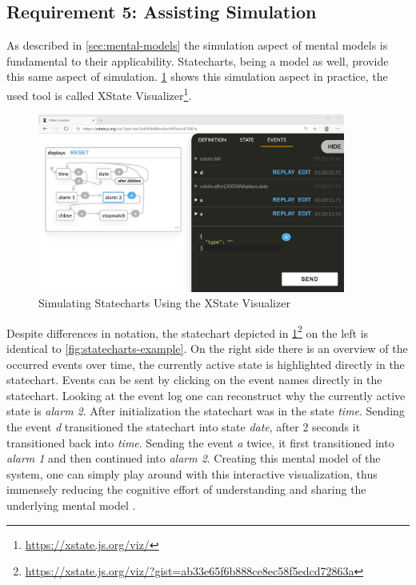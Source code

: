 \subsection{Requirement 5: Assisting Simulation}
As described in \cref{sec:mental-models} the simulation aspect of mental models is fundamental to their applicability.
Statecharts, being a model as well, provide this same aspect of simulation.
\cref{fig:xstate-simulation} shows this simulation aspect in practice, the used tool is called XState Visualizer\footnote{\url{https://xstate.js.org/viz/}}.
\begin{figure}[h]
\centering
\includegraphics[width=0.9\textwidth]{images/xstate-simulation}
\caption{Simulating Statecharts Using the XState Visualizer}
\label{fig:xstate-simulation}
\end{figure}
Despite differences in notation, the statechart depicted in \cref{fig:xstate-simulation}\footnote{\url{https://xstate.js.org/viz/?gist=ab33e65f6b888ce8ec58f5edcd72863a}} on the left is identical to \cref{fig:statecharts-example}.
On the right side there is an overview of the occurred events over time, the currently active state is highlighted directly in the statechart.
Events can be sent by clicking on the event names directly in the statechart.
Looking at the event log one can reconstruct why the currently active state is \emph{alarm 2}.
After initialization the statechart was in the state \emph{time}. Sending the event \emph{d} transitioned the statechart into state \emph{date}, after 2 seconds it transitioned back into \emph{time}.
Sending the event \emph{a} twice, it first transitioned into \emph{alarm 1} and then continued into \emph{alarm 2}.
Creating this mental model of the system, one can simply play around with this interactive visualization, thus immensely reducing the cognitive effort of understanding and sharing the underlying mental model \autocite{dutke_mentale_1994}.

